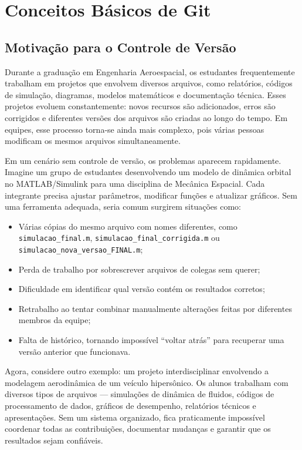\newpage
\section{Conceitos Básicos de Git}
\subsection{Motivação para o Controle de Versão}

Durante a graduação em Engenharia Aeroespacial, os estudantes frequentemente trabalham em projetos que envolvem diversos arquivos, como relatórios, códigos de simulação, diagramas, modelos matemáticos e documentação técnica. Esses projetos evoluem constantemente: novos recursos são adicionados, erros são corrigidos e diferentes versões dos arquivos são criadas ao longo do tempo. Em equipes, esse processo torna-se ainda mais complexo, pois várias pessoas modificam os mesmos arquivos simultaneamente.

Em um cenário sem controle de versão, os problemas aparecem rapidamente. Imagine um grupo de estudantes desenvolvendo um modelo de dinâmica orbital no MATLAB/Simulink para uma disciplina de Mecânica Espacial. Cada integrante precisa ajustar parâmetros, modificar funções e atualizar gráficos. Sem uma ferramenta adequada, seria comum surgirem situações como:

\begin{itemize}
    \item Várias cópias do mesmo arquivo com nomes diferentes, como \texttt{simulacao\_final.m}, \texttt{simulacao\_final\_corrigida.m} ou \texttt{simulacao\_nova\_versao\_FINAL.m};
    \item Perda de trabalho por sobrescrever arquivos de colegas sem querer;
    \item Dificuldade em identificar qual versão contém os resultados corretos;
    \item Retrabalho ao tentar combinar manualmente alterações feitas por diferentes membros da equipe;
    \item Falta de histórico, tornando impossível “voltar atrás” para recuperar uma versão anterior que funcionava.
\end{itemize}

Agora, considere outro exemplo: um projeto interdisciplinar envolvendo a modelagem aerodinâmica de um veículo hipersônico. Os alunos trabalham com diversos tipos de arquivos — simulações de dinâmica de fluidos, códigos de processamento de dados, gráficos de desempenho, relatórios técnicos e apresentações. Sem um sistema organizado, fica praticamente impossível coordenar todas as contribuições, documentar mudanças e garantir que os resultados sejam confiáveis.

